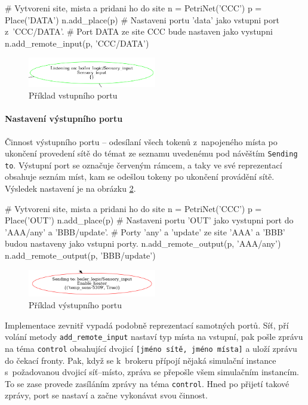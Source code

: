 \begin{python}
  # Vytvoreni site, mista a pridani ho do site
  n = PetriNet('CCC')
  p = Place('DATA')
  n.add_place(p)
  # Nastaveni portu 'data' jako vstupni port z~'CCC/DATA'.
  # Port DATA ze site CCC bude nastaven jako vystupni
  n.add_remote_input(p, 'CCC/DATA')
\end{python}


\begin{figure}[hbt]
 \centering
 \includegraphics[width=0.5\textwidth]{obrazky-figures/port-in.png}
 \caption{Příklad vstupního portu}
 \label{port-in}
\end{figure}

\paragraph{Nastavení výstupního portu}

Činnost výstupního portu -- odesílaní všech tokenů z~napojeného místa po ukončení provedení sítě do témat ze seznamu uvedenému pod návěštím \texttt{Sending to}. Výstupní port se označuje červeným rámcem, a taky ve své reprezentací obsahuje seznám míst, kam se odešlou tokeny po ukončení provádění sítě. Výsledek nastavení je na obrázku \ref{port-out}.

\begin{python}
  # Vytvoreni site, mista a pridani ho do site
  n = PetriNet('CCC')
  p = Place('OUT')
  n.add_place(p)
  # Nastaveni portu 'OUT' jako vystupni port do 'AAA/any' a 'BBB/update'.
  # Porty 'any' a 'update' ze site 'AAA' a 'BBB' budou nastaveny jako vstupni porty.
  n.add_remote_output(p, 'AAA/any')
  n.add_remote_output(p, 'BBB/update')
\end{python}


\begin{figure}[hbt]
  \centering
  \includegraphics[width=0.5\textwidth]{obrazky-figures/port-out.png}
  \caption{Příklad výstupního portu}
  \label{port-out}
\end{figure}


Implementace zevnitř vypadá podobně reprezentací samotných portů. Síť, pří volání metody \texttt{add\_remote\_input} nastaví typ místa na vstupní, pak pošle zprávu na téma \texttt{control} obsahující dvojicí \texttt{[jméno sítě, jméno místa]} a uloží zprávu do čekací fronty. Pak, když se k~brokeru přípojí nějaká simulační instance s~požadovanou dvojicí síť--místo, zpráva se přepošle všem simulačním instancím. To se zase provede zasíláním zprávy na téma \texttt{control}. Hned po přijetí takové zprávy, port se nastaví a začne vykonávat svou činnost.

